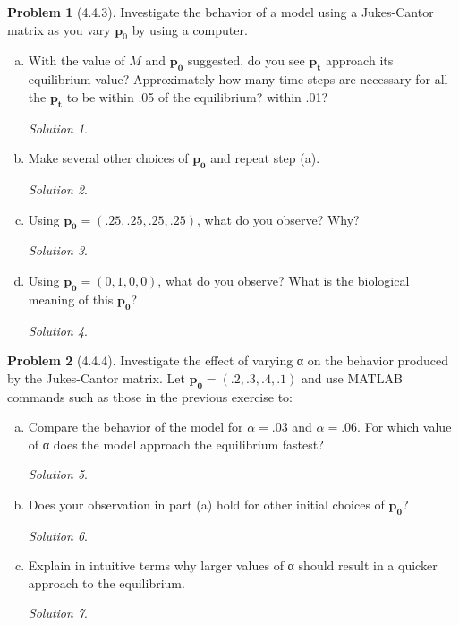 \documentclass[11pt]{article}
\theoremstyle{definition}\newtheorem*{problem}{Problem}
\theoremstyle{remark}\newtheorem{claim}{Claim}
\theoremstyle{remark}\newtheorem*{sol}{Solution}
\begin{document}
\begin{problem}[4.4.3] 
Investigate the behavior of a model using a Jukes-Cantor matrix as you vary $\mathbf p_0$ by using a computer.\end{problem}
\begin{enumerate}[a.]
\item With the value of $M$ and $\mathbf {p_0}$ suggested, do you see $\mathbf {p_t}$ approach its equilibrium value? Approximately how many time steps are necessary for all the $\mathbf {p_t}$ to be within .05 of the equilibrium? within .01?
\begin{sol}

\end{sol}

\item Make several other choices of $\mathbf {p_0}$ and repeat step (a). 
\begin{sol}

\end{sol}

\item Using $\mathbf {p_0}= (.25,.25,.25,.25)$, what do you observe? Why?
\begin{sol}

\end{sol}

\item Using $\mathbf {p_0}= (0,1,0,0)$, what do you observe? What is the biological meaning of this $\mathbf {p_0}$?
\begin{sol}

\end{sol}
\end{enumerate}

\begin{problem}[4.4.4] Investigate the effect of varying α on the behavior produced by the Jukes-Cantor matrix. Let $\mathbf {p_0}=(.2,.3,.4,.1)$ and use MATLAB commands such as those in the previous exercise to:
\end{problem}
\begin{enumerate}[a.]
\item Compare the behavior of the model for $\alpha = .03$ and $\alpha = .06$. For which value of α does the model approach the equilibrium fastest?
\begin{sol}

\end{sol}

\item Does your observation in part (a) hold for other initial choices of $\mathbf {p_0}$? 
\begin{sol}

\end{sol}

\item Explain in intuitive terms why larger values of α should result in a quicker approach to the equilibrium.
\begin{sol}

\end{sol}
\end{enumerate}

\end{document}
